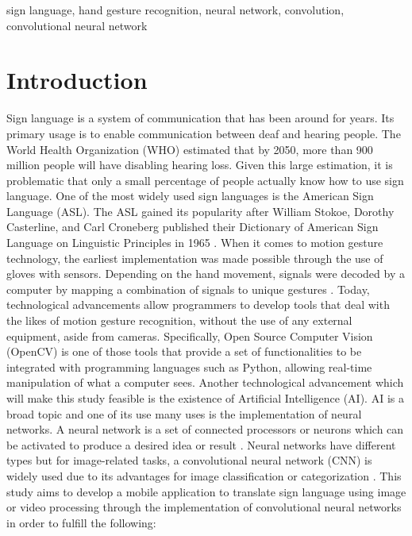 \documentclass[journal]{./IEEE/IEEEtran}
\title{\SPTITLE}
\author{\ADVISEE~and~\ADVISER%
\REMARK
}
\begin{document}
\maketitle


\begin{keywords}
sign language, hand gesture recognition, neural network, convolution, convolutional neural network
\end{keywords}

\section{Introduction}
Sign language is a system of communication that has been around for years. Its primary usage is to enable communication between deaf and hearing people. The World Health Organization (WHO) \cite{WHO2018} estimated that by 2050, more than 900 million people will have disabling hearing loss. Given this large estimation, it is problematic that only a small percentage of people actually know how to use sign language. One of the most widely used sign languages is the American Sign Language (ASL). The ASL gained its popularity after William Stokoe, Dorothy Casterline, and Carl Croneberg published their Dictionary of American Sign Language on Linguistic Principles in 1965 \cite{Wilcox1991}.
\newline
\indent When it comes to motion gesture technology, the earliest implementation was made possible through the use of gloves with sensors. Depending on the hand movement, signals were decoded by a computer by mapping a combination of signals to unique gestures \cite{Sharma2015}.  Today, technological advancements allow programmers to develop tools that deal with the likes of motion gesture recognition, without the use of any external equipment, aside from cameras. Specifically, Open Source Computer Vision (OpenCV) is one of those tools that provide a set of functionalities to be integrated with programming languages such as Python, allowing real-time manipulation of what a computer sees.
\newline
\indent Another technological advancement which will make this study feasible is the existence of Artificial Intelligence (AI). AI is a broad topic and one of its use many uses is the implementation of neural networks. A neural network is a set of connected processors or neurons which can be activated to produce a desired idea or result \cite{Schmidhuber2015}. Neural networks have different types but for image-related tasks, a convolutional neural network (CNN) is widely used due to its advantages for image classification or categorization \cite{Wu2016}.
\newline
\indent This study aims to develop a mobile application to translate sign language using image or video processing through the implementation of convolutional neural networks in order to fulfill the following:
\end{document}
